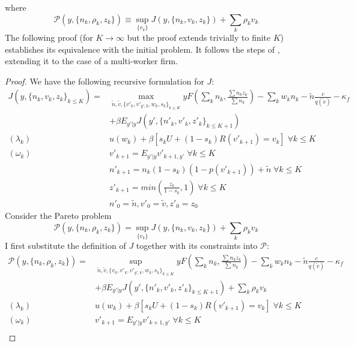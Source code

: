 where
\[\mathcal{P}(y,\{n_k,\rho_k,z_k\}) \equiv \sup_{\{v_k\}} J(y,\{n_k,v_k,z_k\})+\sum_k \rho_k v_k \]
The following proof (for $K\rightarrow\infty$ but the proof extends trivially to finite $K$) establishes its equivalence with the initial problem. It follows the steps of \textcite{balke2022}, extending it to the case of a multi-worker firm.
\begin{proof}
We have the following recursive formulation for $J$:
\begin{equation*}
    \begin{split}
 J(y,\{n_k,v_k,z_k\}_{k\leq K}) =
    & \max_{\tilde{n},\tilde{v},\{v'_k,v'_{y',k},w_{k},s_{k}\}_{k\leq K}} 
    yF(\sum_k n_k,\frac{\sum n_kz_k}{\sum n_k})-
    \sum_k w_kn_k
    -\tilde{n}\frac{c}{q(\tilde{v})}-\kappa_f \\
    & +\beta E_{y'|y} J(y',\{n'_k,v'_k,z'_k\}_{k\leq K+1}) \\
(\lambda_k) \: & u(w_k) + \beta [s_k U + (1-s_k)R(v'_{k+1})=v_k] \; \forall k\leq K \\
(\omega_k)    & v'_{k+1} = E_{y'|y} v'_{k+1,y'} \; \forall k\leq K \\
    & n'_{k+1} = n_k(1-s_k)(1-p(v'_{k+1}))+\tilde{n}\; \forall k\leq K \\
    & z'_{k+1} = min(\frac{z_k}{1-s_k},1)\; \forall k\leq K \\
    & n'_0 = \tilde{n}, v'_0 = \tilde{v}, z'_0 = z_0
    \end{split}
\end{equation*}
Consider the Pareto problem
\[\mathcal{P}(y,\{n_k,\rho_k,z_k\}) = \sup_{\{v_k\}} J(y,\{n_k,v_k,z_k\})+\sum_k \rho_k v_k \]
I first substitute the definition of $J$ together with its constraints into $\mathcal{P}$:
\begin{equation*}
    \begin{split}
 \mathcal{P}(y,\{n_k,\rho_k,z_k\}) =
    & \sup_{\tilde{n},\tilde{v},\{v_k,v'_{k},v'_{y',k},w_{k},s_{k}\}_{k\leq K}} 
    yF(\sum_k n_k,\frac{\sum n_kz_k}{\sum n_k})-
    \sum_k w_kn_k
    -\tilde{n}\frac{c}{q(\tilde{v})}-\kappa_f \\
    & +\beta E_{y'|y} J(y',\{n'_k,v'_k,z'_k\}_{k\leq K+1}) + \sum_k \rho_k v_k  \\
(\lambda_k) \: & u(w_k) + \beta [s_k U + (1-s_k)R(v'_{k+1})=v_k] \; \forall k\leq K \\
(\omega_k) \:   & v'_{k+1} = E_{y'|y} v'_{k+1,y'} \; \forall k\leq K \\

\end{split}
\end{equation*}
\end{proof}
